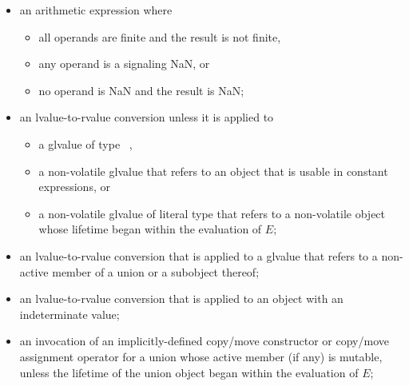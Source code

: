 \begin{itemize}
\item
an arithmetic expression where
\begin{itemize}
\item all operands are finite and the result is not finite,
\item any operand is a signaling NaN, or
\item no operand is NaN and the result is NaN;
\end{itemize}

\item
an lvalue-to-rvalue conversion unless
it is applied to
\begin{itemize}
  \item
  a glvalue of type \cv{}~,

  \item
  a non-volatile glvalue that refers to an object that is
  usable in constant expressions, or

  \item
  a non-volatile glvalue of literal type that refers to a non-volatile object
  whose lifetime began within the evaluation of $E$;
\end{itemize}

\item
an lvalue-to-rvalue conversion
that is applied to a glvalue
that refers to a non-active member of a union or a subobject thereof;

\item
an lvalue-to-rvalue conversion that is applied to
an object with an indeterminate value;

\item
an invocation of an implicitly-defined copy/move constructor or
copy/move assignment operator
for a union whose active member (if any) is mutable,
unless the lifetime of the union object began within the evaluation of $E$;


\end{itemize}
